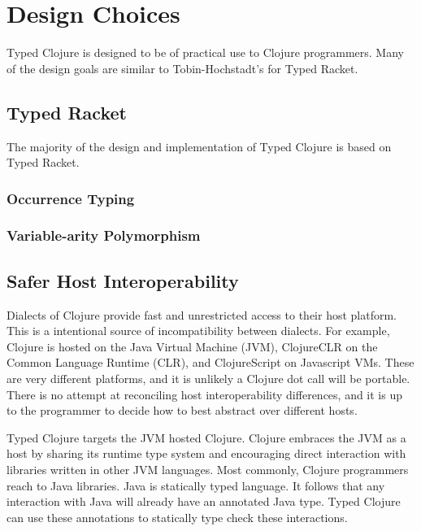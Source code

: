 \chapter{Design Choices}

Typed Clojure is designed to be of practical use to Clojure programmers.
Many of the design goals are similar to Tobin-Hochstadt's \cite{SAMTH:dissertation}
for Typed Racket.

\section{Typed Racket}

The majority of the design and implementation of Typed Clojure is based on Typed Racket.

\subsection{Occurrence Typing}

\subsection{Variable-arity Polymorphism}

\section{Safer Host Interoperability}

Dialects of Clojure provide fast and unrestricted access to their host platform. 
This is a intentional source of incompatibility between dialects.
For example, Clojure is hosted on the Java Virtual Machine (JVM), ClojureCLR on the Common Language Runtime (CLR),
and ClojureScript on Javascript VMs. These are very different platforms, and it is unlikely
a Clojure dot call will be portable. There is no attempt at reconciling
host interoperability differences, and it is up to the programmer to decide
how to best abstract over different hosts.

Typed Clojure targets the JVM hosted Clojure.
Clojure embraces the JVM as a host by sharing its runtime type system and encouraging direct
interaction with libraries written in other JVM languages. Most commonly, Clojure programmers
reach to Java libraries. Java is statically typed language. It follows that any interaction with
Java will already have an annotated Java type. Typed Clojure can use these annotations
to statically type check these interactions.

